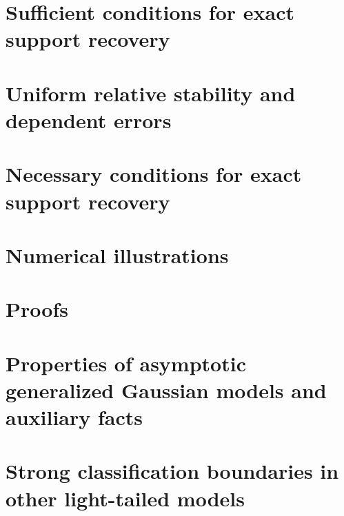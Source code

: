\documentclass[aos,preprint]{imsart}
\numberwithin{equation}{section}
\theoremstyle{plain}
\theoremstyle{remark}
\begin{document}
\section{Sufficient conditions for exact support recovery}
\label{sec:sufficient}



\section{Uniform relative stability and dependent errors}
\label{sec:URS}


\section{Necessary conditions for exact support recovery}
\label{sec:necessary}



\section{Numerical illustrations}
\label{sec:numerical}


%

\appendix

\section{Proofs}
\label{sec:proofs}





\section{Properties of asymptotic generalized Gaussian models and auxiliary facts}
\label{sec:AGG}


% 

\section{Strong classification boundaries in other light-tailed models}
\label{sec:other-boundaries}

\end{document}
